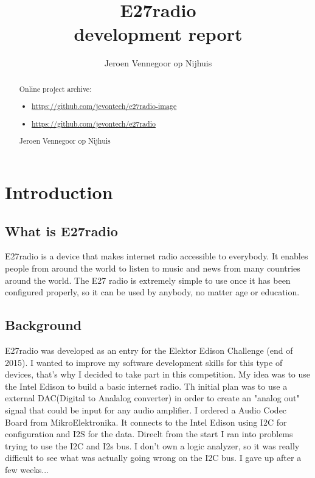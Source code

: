 \documentclass[12pt,a4paper]{scrreprt}
\author{Jeroen Vennegoor op Nijhuis}
\title{E27radio \\ development report}
\begin{document}
\maketitle

\begin{abstract}
Online project archive: 

\begin{itemize}
	\item \url{https://github.com/jevontech/e27radio-image}\\
	\item \url{https://github.com/jevontech/e27radio}\\

\end{itemize}

\begin{center}
 Jeroen Vennegoor op Nijhuis
\end{center}


\end{abstract}

\tableofcontents

\chapter{Introduction}


\section{What is E27radio}
E27radio is a device that makes internet radio accessible to everybody. It enables people from around the world to listen to music and news from many countries around the world. The E27 radio is extremely simple to use once it has been configured properly, so it can be used by anybody, no matter age or education. 

\section{Background}
E27radio was developed as an entry for the Elektor Edison Challenge (end of 2015). I wanted to improve my software development skills for this type of devices, that's why I decided to take part in this competition.
My idea was to use the Intel Edison to build a basic internet radio.
Th initial plan was to use a external DAC(Digital to Analalog converter) in order to create an "analog out" signal that could be input for any audio amplifier.
I ordered a Audio Codec Board from MikroElektronika. It connects to the Intel Edison using I2C for configuration and I2S for the data. 
Direclt from the start I ran into problems trying to use the I2C and I2s bus.
I don't own a logic analyzer, so it was really difficult to see what was actually going wrong on the I2C bus. I gave up after a few weeks...
\end{document}
